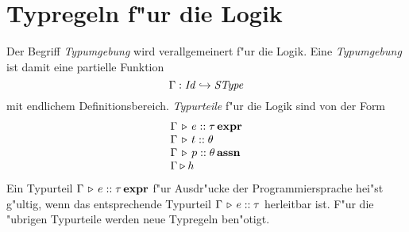 \documentclass[12pt,a4paper,bigheadings]{scrartcl}
\newcommand{\assn}{\ensuremath{\mathbf{assn}}}
\newcommand{\atype}[1]{#1\,\assn}
\newcommand{\bexpr}{\ensuremath{\mathbf{expr}}}
\newcommand{\etype}[1]{#1\,\bexpr}
\newcommand{\Stype}{\name{SType}}
\begin{document}
\section{Typregeln f"ur die Logik}

Der Begriff {\em Typumgebung} wird verallgemeinert f"ur die Logik. Eine {\em Typumgebung} ist
damit eine partielle Funktion
\[
  \Gamma: \Id \pto \Stype
\]
mit endlichem Definitionsbereich. {\em Typurteile} f"ur die Logik sind von der Form
\[\begin{array}{l}
  \Tj{\Gamma}{e}{\etype{\tau}} \\
  \Tj{\Gamma}{t}{\theta} \\
  \Tj{\Gamma}{p}{\atype{\theta}} \\
  \Tjh{\Gamma}{h}
\end{array}\]
Ein Typurteil $\Tj{\Gamma}{e}{\etype{\tau}}$ f"ur Ausdr"ucke der Programmiersprache hei"st
g"ultig, wenn das entsprechende Typurteil $\Gamma \, \triangleright \, e\mathrel{::}\tau$ herleitbar ist. F"ur die
"ubrigen Typurteile werden neue Typregeln ben"otigt.
\end{document}
